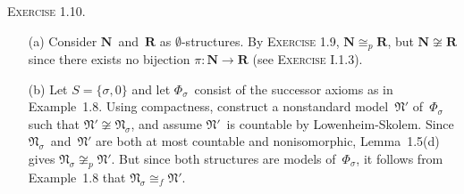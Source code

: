 \documentclass[letterpaper]{article}
\newcommand{\N}{\mathbf{N}}
\newcommand{\Ns}{\mathfrak{N}}
\newcommand{\R}{\mathbf{R}}
\newcommand{\iso}{\cong}
\newcommand{\fiso}{\iso_f}
\newcommand{\piso}{\iso_p}
\theoremstyle{remark}
\begin{document}
\noindent\textsc{Exercise 1.10.}
\begin{enumerate}
\item[(a)] Consider $\N$~and~$\R$ as $\emptyset$-structures. By \textsc{Exercise 1.9}, $\N\piso\R$, but $\N\not\iso\R$ since there exists no bijection $\pi:\N\to\R$ (see \textsc{Exercise I.1.3}).
\item[(b)] Let $S=\{\sigma,0\}$ and let $\Phi_{\sigma}$~consist of the successor axioms as in Example~1.8. Using compactness, construct a nonstandard model~$\Ns'$ of~$\Phi_{\sigma}$ such that $\Ns'\not\iso\Ns_{\sigma}$, and assume $\Ns'$~is countable by Lowenheim-Skolem. Since $\Ns_{\sigma}$~and~$\Ns'$ are both at most countable and nonisomorphic, Lemma~1.5(d) gives $\Ns_{\sigma}\not\piso\Ns'$. But since both structures are models of~$\Phi_{\sigma}$, it follows from Example~1.8 that $\Ns_{\sigma}\fiso\Ns'$.
\end{enumerate}
\end{document}
